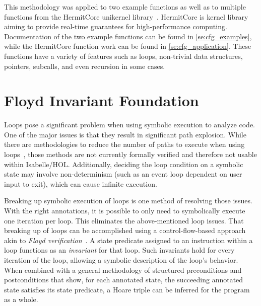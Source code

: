 This methodology was applied to two example functions
as well as to multiple functions
from the HermitCore unikernel library~\citep{lankes2016hermitcore}.
HermitCore is  kernel library aiming to provide real-time guarantees for high-performance computing.
Documentation of the two example functions can be found in \cref{se:cfg_examples},
while the HermitCore function work can be found in \cref{se:cfg_application}.
These functions have a variety of features such as loops,
non-trivial data structures, pointers, subcalls, and even recursion in some cases.

\section{Floyd Invariant Foundation}\label{se:cfg_invariant}
Loops pose a significant problem when using symbolic execution to analyze code.
One of the major issues is that they result in significant path explosion.
While there are methodologies to reduce the number of paths to execute
when using loops~\citep{saxena2009lese,obdrzalek2011efficient},
those methods are not currently formally verified
and therefore not usable within Isabelle/HOL.
Additionally, deciding the loop condition on a symbolic state
may involve non-determinism (such as an event loop dependent on user input to exit),
which can cause infinite execution.

Breaking up symbolic execution of loops is one method of resolving those issues.
With the right annotations,
it is possible to only need to symbolically execute one iteration per loop.
This eliminates the above-mentioned loop issues.
That breaking up of loops can be accomplished using a control-flow-based approach
akin to \emph{Floyd verification}~\citep{floyd1967assigning}.
A state predicate assigned to an instruction within a loop
functions as an \emph{invariant} for that loop.
Such invariants hold for every iteration of the loop,
allowing a symbolic description of the loop's behavior.
When combined with a general methodology
of structured preconditions and postconditions that show,
for each annotated state, the succeeding annotated state satisfies its state predicate,
a Hoare triple can be inferred for the program as a whole.

